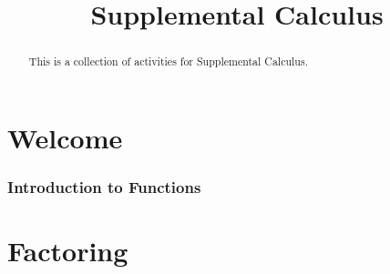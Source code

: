 \documentclass{xourse}
\title{Supplemental Calculus}
\begin{document}
\begin{abstract}
This is a collection of activities for Supplemental Calculus.
\end{abstract}

\maketitle

\part{Welcome}


%
%
%
\section{Introduction to Functions}

%
%

\part{Factoring}

\end{document}
